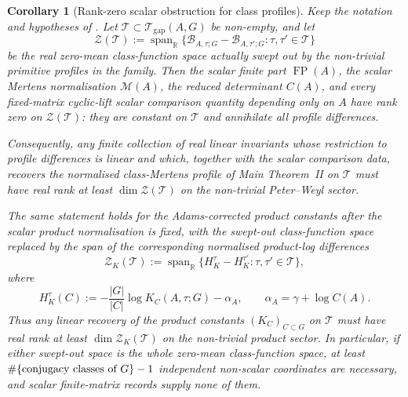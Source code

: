 \documentclass[11pt,a4paper]{amsart}
\theoremstyle{plain}
\newtheorem{corollary}[theorem]{Corollary}
\theoremstyle{definition}
\theoremstyle{remark}
\DeclareMathOperator{\FP}{FP}
\begin{document}
\begin{corollary}[Rank-zero scalar obstruction for class profiles]
  \label{cor:scalar-record-rank-zero-bound}
  Keep the notation and hypotheses of
  .  Let
  \(\mathscr T\subset\mathcal T_{\mathrm{gap}}(A,G)\) be non-empty, and let
  \[
    \mathcal Z(\mathscr T)
    :=
    \operatorname{span}_{\mathbb{R}}
    \{\mathcal B_{A,\tau;G}-\mathcal B_{A,\tau';G}:
        \tau,\tau'\in\mathscr T\}
  \]
  be the real zero-mean class-function space actually swept out by the
  non-trivial primitive profiles in the family.  Then the scalar finite part
  \(\FP(A)\), the scalar Mertens normalisation \(\mathcal M(A)\), the reduced
  determinant \(C(A)\), and every fixed-matrix cyclic-lift scalar comparison
  quantity depending only on \(A\) have rank zero on
  \(\mathcal Z(\mathscr T)\): they are constant on \(\mathscr T\) and
  annihilate all profile differences.

  Consequently, any finite collection of real linear invariants whose
  restriction to profile differences is linear and which, together with the
  scalar comparison data, recovers the normalised class-Mertens profile of Main
  Theorem~II on \(\mathscr T\) must have real rank at least
  \(\dim\mathcal Z(\mathscr T)\) on the non-trivial Peter--Weyl sector.

  The same statement holds for the Adams-corrected product constants after the
  scalar product normalisation is fixed, with the swept-out class-function space
  replaced by the span of the corresponding normalised product-log differences
  \[
    \mathcal Z_K(\mathscr T)
    :=
    \operatorname{span}_{\mathbb{R}}
    \{H_K^{\tau}-H_K^{\tau'}:
        \tau,\tau'\in\mathscr T\},
  \]
  where
  \[
    H_K^{\tau}(C):=-\frac{|G|}{|C|}\log K_C(A,\tau;G)-\alpha_A,
    \qquad
    \alpha_A=\gamma+\log C(A).
  \]
  Thus any linear recovery of the product
  constants \((K_C)_{C\subset G}\) on \(\mathscr T\) must have real rank at
  least \(\dim\mathcal Z_K(\mathscr T)\) on the non-trivial product sector.
  In particular, if either swept-out space is the whole zero-mean
  class-function space, at least
  \(\#\{\textup{conjugacy classes of }G\}-1\) independent non-scalar
  coordinates are necessary, and scalar finite-matrix records supply none of
  them.
\end{corollary}
\end{document}
